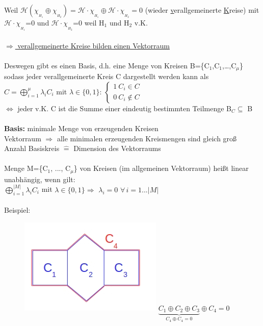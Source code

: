 Weil $\mathcal{H} (\chi_{_{H_1}} \oplus \chi_{_{H_2}}) = \mathcal{H} \cdot \chi_{_{H_1}} \oplus \mathcal{H} \cdot \chi_{_{H_2}} = 0$ (wieder \underline{v}erallgemeinerte \underline{K}reise) mit\\
$\mathcal{H} \cdot \chi_{_{H_1}}$=0 und $\mathcal{H} \cdot \chi_{_{H_2}}$=0 weil H$_1$ und H$_2$ v.K.
\\\\
\underline{$\Rightarrow$ verallgemeinerte Kreise bilden einen Vektorraum}
\\\\
Deswegen gibt es einen Basis, d.h. eine Menge von Kreisen B=\{C$_1$,C$_1$,…,C$_{\mu}$\} sodass jeder verallgemeinerte Kreis C dargestellt werden kann als\\
$C=\bigoplus\limits_{i=1}^{\mu} \lambda_i C_i$ mit $\lambda \in \{0,1\}$: $
\begin{cases}
	1\ C_i \in C\\
	0\ C_i \notin C
\end{cases}
$
\\
$\Leftrightarrow$ jeder v.K. C ist die Summe einer eindeutig bestimmten Teilmenge B$_C \subseteq$ B
\\\\
\textbf{Basis:} minimale Menge von erzeugenden Kreisen
\\
Vektorraum $\Rightarrow$ alle minimalen erzeugenden Kreismengen sind gleich groß\\
Anzahl Basiskreis $\widehat{=}$ Dimension des Vektorraums
\\\\
Menge M=\{C$_1$, ..., C$_\mu$\} von Kreisen (im allgemeinen Vektorraum) heißt linear unabhängig, wenn gilt:\\
$\bigoplus\limits_{i=1}^{|M|} \lambda_i C_i$ mit $\lambda \in \{0,1\}\Rightarrow$ $\lambda_i=0$ $\forall \, i=1 ... |M|$
\\\\
Beispiel:
\begin{figure}[htp]
\centering
\includegraphics[scale=0.75]{lectures/161104/pix/pic6.jpg}
$\underbrace{C_1 \oplus C_2 \oplus C_3}_{C_4 \oplus C_4 = 0} \oplus C_4=0$
\end{figure}

